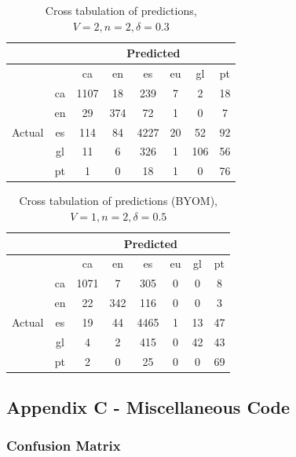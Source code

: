 \documentclass[runningheads]{llncs}
\begin{document}
\newpage

\begin{table}
	\centering
	\caption{Cross tabulation of predictions, $V=2, n=2, \delta=0.3$}
	\begin{tabular}{|c|c|c|c|c|c|c|c|} \hline
	    & & \multicolumn{6}{c|}{Predicted} \\ \hline
		& &    ca &   en &    es &  eu &   gl &  pt \\ \hline
		\multirow{6}{*}{Actual} & ca   &  1107 &   18 &   239 &   7 &    2 &  18 \\
		& en   &    29 &  374 &    72 &   1 &    0 &   7 \\
		& es   &   114 &   84 &  4227 &  20 &   52 &  92 \\
		& gl   &    11 &    6 &   326 &   1 &  106 &  56 \\
		& pt   &     1 &    0 &    18 &   1 &    0 &  76 \\ \hline
	\end{tabular}
\end{table}

\begin{table}
	\centering
	\caption{Cross tabulation of predictions (BYOM), $V=1, n=2, \delta=0.5$}
		\begin{tabular}{|c|c|c|c|c|c|c|c|} \hline
		& & \multicolumn{6}{c|}{Predicted} \\ \hline
		& &  ca &   en &    es &  eu &  gl &  pt \\ \hline
		\multirow{6}{*}{Actual} & ca   &  1071 &    7 &   305 &   0 &   0 &   8 \\
		& en   &    22 &  342 &   116 &   0 &   0 &   3 \\
		& es   &    19 &   44 &  4465 &   1 &  13 &  47 \\
		& gl   &     4 &    2 &   415 &   0 &  42 &  43 \\
		& pt   &     2 &    0 &    25 &   0 &   0 &  69 \\ \hline
    \end{tabular}
\end{table}

\subsection{Appendix C - Miscellaneous Code}

\subsubsection{Confusion Matrix}
\end{document}
